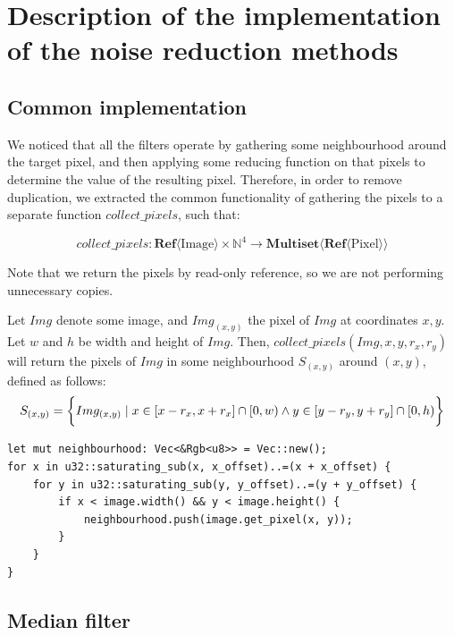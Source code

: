 \documentclass[12pt]{article}
\begin{document}
\section*{Description of the implementation of the noise reduction methods}

\subsection*{Common implementation}
We noticed that all the filters operate by gathering some neighbourhood around the target pixel,
and then applying some reducing function on that pixels to determine the value of the resulting pixel.
Therefore, in order to remove duplication, we extracted the common functionality of gathering the pixels to a separate function $collect\_pixels$, such that:

\begin{equation*}
    collect\_pixels : \mathbf{Ref}\langle\mathrm{Image}\rangle \times \mathbb{N}^4 \to \mathbf{Multiset}\langle \mathbf{Ref}\langle\mathrm{Pixel} \rangle\rangle
\end{equation*}

Note that we return the pixels by read-only reference, so we are not performing unnecessary copies.

Let $Img$ denote some image, and $Img_{(x,y)}$ the pixel of $Img$ at coordinates $x,y$.
Let $w$ and $h$ be width and height of $Img$. 
Then, $collect\_pixels(Img,x,y,r_x,r_y)$ will return the pixels of $Img$ in some neighbourhood $S_{(x,y)}$ around $(x,y)$, defined as follows:
\begin{equation}
    S_{(x,y)} = 
    \\\bigg\{
        Img_{(x,y)} \mid x \in [x-r_x,x+r_x] \cap [0,w) \land y \in [y-r_y, y+r_y] \cap [0,h)
    \bigg\}
\end{equation}

\begin{lstlisting}
let mut neighbourhood: Vec<&Rgb<u8>> = Vec::new();
for x in u32::saturating_sub(x, x_offset)..=(x + x_offset) {
    for y in u32::saturating_sub(y, y_offset)..=(y + y_offset) {
        if x < image.width() && y < image.height() {
            neighbourhood.push(image.get_pixel(x, y));
        }
    }
}
\end{lstlisting}


\subsection*{Median filter}
\end{document}
